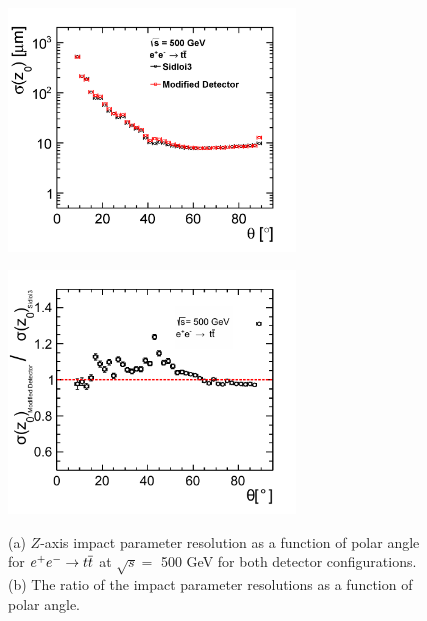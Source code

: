 \begin{figure}[h!]
\begin{minipage}{3.0in}
\centering
\includegraphics[width=3.0in]{eettbarZ0ResolutionTheta_sidloi3_det_vtxbar_3doublet.png}
\label{fig:eettbarz0restwodetectors}
\end{minipage}
\begin{minipage}{3.0in}
\centering
\includegraphics[width=3.0in]{eettbarZ0ResolutionThetaRatio2.pdf}
\label{fig:eettbarz0resratio}
\end{minipage}
\caption{(a) $Z$-axis impact parameter resolution as a function of polar angle for
$\ee \rightarrow \ttbar$  at $\sqrt{s} = $ 500 GeV for both detector configurations.
(b) The ratio of the impact parameter resolutions as a function of polar angle.}
\label{fig:eettbarz0res}
\end{figure}


